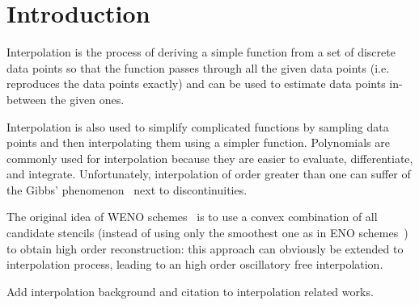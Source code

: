 \section{Introduction}\label{sec:introduction}

Interpolation is the process of deriving a simple function from a set of discrete data points so that the function passes through all the given data points (i.e. reproduces the data points exactly) and can be used to estimate data points in-between the given ones.

Interpolation is also used to simplify complicated functions by sampling data points and then interpolating them using a simpler function. Polynomials are commonly used for interpolation because they are easier to evaluate, differentiate, and integrate. Unfortunately, interpolation of order greater than one can suffer of the Gibbs' phenomenon~\cite{gibbs-b-1906} next to discontinuities.

The original idea of WENO schemes~\cite{liu-1994} is to use a convex combination of all candidate stencils (instead of using only the smoothest one as in ENO schemes~\cite{harten-1987}) to obtain high order reconstruction: this approach can obviously be extended to interpolation process, leading to an high order oscillatory free interpolation.

{\color{red} Add interpolation background and citation to interpolation related works.}
